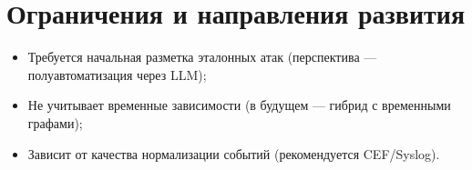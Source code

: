\section{Ограничения и направления развития}

\begin{itemize}
    \item Требуется начальная разметка эталонных атак (перспектива — полуавтоматизация через LLM);
    \item Не учитывает временные зависимости (в будущем — гибрид с временными графами);
    \item Зависит от качества нормализации событий (рекомендуется CEF/Syslog).
\end{itemize}